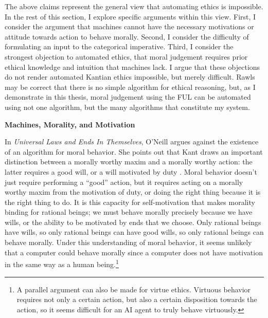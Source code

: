 \begin{isabellebody}
\begin{isamarkuptext}
The above claims represent the general view that automating ethics is impossible. In the
rest of this section, I explore specific arguments within this view. First, I consider the argument 
that machines cannot have the necessary motivations or attitude towards action to behave morally. Second, 
I consider the difficulty of formulating
an input to the categorical imperative. Third, I consider the strongest objection to automated ethics, 
that moral judgement requires prior ethical knowledge and intuition that machines lack. I argue that 
these objections do not render automated Kantian ethics impossible, but merely difficult. Rawls may be 
correct that there is no simple algorithm for ethical reasoning, but, as
I demonstrate in this thesis, moral judgement using the FUL can be automated using not one
algorithm, but the many algorithms that constitute my system.

\medskip

\noindent \textbf{Machines, Morality, and Motivation}

In \emph{Universal Laws and Ends In Themselves}, O'Neill argues against the existence of an algorithm for
moral behavior. She points out that Kant draws an important distinction between a morally worthy maxim
and a morally worthy action: the latter requires a good will, or a will motivated by duty \citep[345]{oneilluniversallaws}. 
Moral behavior doesn't just require performing
a ``good'' action, but it requires acting on a morally worthy maxim from the motivation of duty, or 
doing the right thing because it is the right thing to do. It is this capacity 
for self-motivation that makes morality binding for rational beings; we must behave morally precisely 
because we have wills, or the ability to be motivated by ends
that we choose. Only rational beings have wills, so only rational beings can have good wills, so only 
rational beings can behave morally. Under this understanding
of moral behavior, it seems unlikely that a computer could behave morally
since a computer does not have motivation in the same way as a human being.\footnote{A parallel argument can also be made for virtue ethics. Virtuous
behavior requires not only a certain action, but also a certain disposition towards the action, so it seems
difficult for an AI agent to truly behave virtuously.}


\end{isamarkuptext}
\end{isabellebody}

